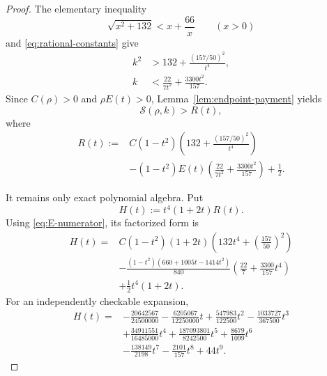 \documentclass[11pt]{article}
\theoremstyle{remark}
\begin{document}
\begin{proof}
The elementary inequality
\[
 \sqrt{x^2+132}<x+\frac{66}{x}\qquad(x>0)
 \]
and \eqref{eq:rational-constants} give
\begin{align}
 k^2&>
 132+\frac{(157/50)^2}{t^4},
 \label{eq:k-square-lower}\\
 k&<
 \frac{22}{7t^2}+\frac{3300t^2}{157}.
 \label{eq:k-upper}
\end{align}
Since \(C(\rho)>0\) and \(\rho E(t)>0\),
Lemma~\ref{lem:endpoint-payment} yields
\begin{equation}
 \mathcal S(\rho,k)>R(t),
 \label{eq:R-lower}
\end{equation}
where
\begin{equation}
 \begin{aligned}
 R(t):={}&
 C(1-t^2)
 \left(132+\frac{(157/50)^2}{t^4}\right)\\
 &-(1-t^2)E(t)
 \left(\frac{22}{7t^2}+\frac{3300t^2}{157}\right)
 +\frac12.
 \end{aligned}
 \label{eq:R}
\end{equation}

It remains only exact polynomial algebra.  Put
\[
 H(t):=t^4(1+2t)R(t).
 \]
Using \eqref{eq:E-numerator}, its factorized form is
\begin{equation}
 \begin{aligned}
 H(t)={}&
 C(1-t^2)(1+2t)
 \left(132t^4+\left(\frac{157}{50}\right)^2\right)\\
 &-\frac{(1-t^2)(660+1005t-1414t^2)}{840}
 \left(\frac{22}{7}+\frac{3300}{157}t^4\right)\\
 &+\frac12t^4(1+2t).
 \end{aligned}
 \label{eq:H-factorized}
\end{equation}
For an independently checkable expansion,
\begin{equation}
 \begin{aligned}
 H(t)={}&
 -\frac{20642567}{24500000}
 -\frac{6205067}{12250000}t
 +\frac{547983}{122500}t^2
 -\frac{1033727}{367500}t^3\\
 &+\frac{34911551}{16485000}t^4
 +\frac{187093801}{8242500}t^5
 +\frac{8679}{1099}t^6\\
 &-\frac{138149}{2198}t^7
 -\frac{2101}{157}t^8
 +44t^9.
 \end{aligned}
 \label{eq:H-expanded}
\end{equation}


\end{proof}
\end{document}
